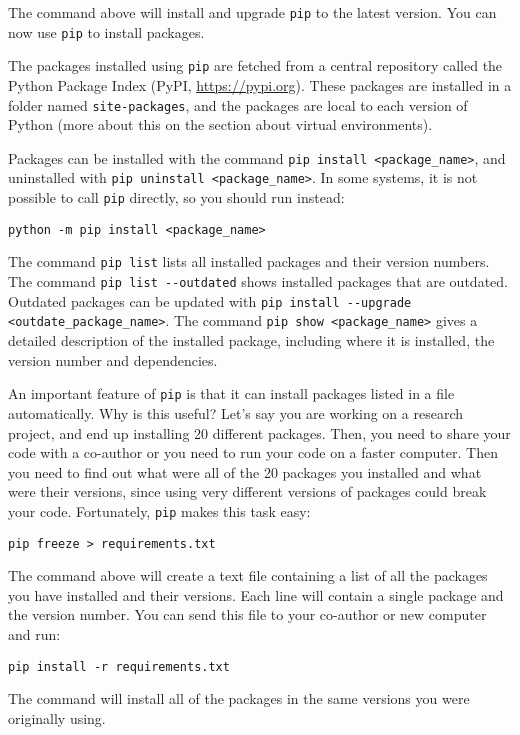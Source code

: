 \documentclass[12pt, a4paper]{article}
\begin{document}
The command above will install and upgrade \texttt{pip} to the latest version.
You can now use \texttt{pip} to install packages.

The packages installed using \texttt{pip} are fetched from a central repository called the Python Package Index (PyPI, \url{https://pypi.org}).
These packages are installed in a folder named \texttt{site-packages}, and the packages are local to each version of Python (more about this on the section about virtual environments).

Packages can be installed with the command \texttt{pip install <package\_name>}, and uninstalled with \texttt{pip uninstall <package\_name>}.
In some systems, it is not possible to call \texttt{pip} directly, so you should run instead:
\lstset{language=bash,label= ,caption= ,captionpos=b,firstnumber=1,numbers=left,style=bash}
\begin{lstlisting}
python -m pip install <package_name>
\end{lstlisting}
The command \texttt{pip list} lists all installed packages and their version numbers.
The command \texttt{pip list -{}-outdated} shows installed packages that are outdated.
Outdated packages can be updated with \texttt{pip install -{}-upgrade <outdate\_package\_name>}.
The command \texttt{pip show <package\_name>} gives a detailed description of the installed package, including where it is installed, the version number and dependencies.

An important feature of \texttt{pip} is that it can install packages listed in a file automatically. Why is this useful? Let's say you are working on a research project, and end up installing 20 different packages. Then, you need to share your code with a co-author or you need to run your code on a faster computer. Then you need to find out what were all of the 20 packages you installed and what were their versions, since using very different versions of packages could break your code.
Fortunately, \texttt{pip} makes this task easy:
\lstset{language=bash,label= ,caption= ,captionpos=b,firstnumber=1,numbers=left,style=bash}
\begin{lstlisting}
pip freeze > requirements.txt
\end{lstlisting}
The command above will create a text file containing a list of all the packages you have installed and their versions. Each line will contain a single package and the version number.
You can send this file to your co-author or new computer and run:
\lstset{language=bash,label= ,caption= ,captionpos=b,firstnumber=1,numbers=left,style=bash}
\begin{lstlisting}
pip install -r requirements.txt
\end{lstlisting}
The command will install all of the packages in the same versions you were originally using.
\end{document}
